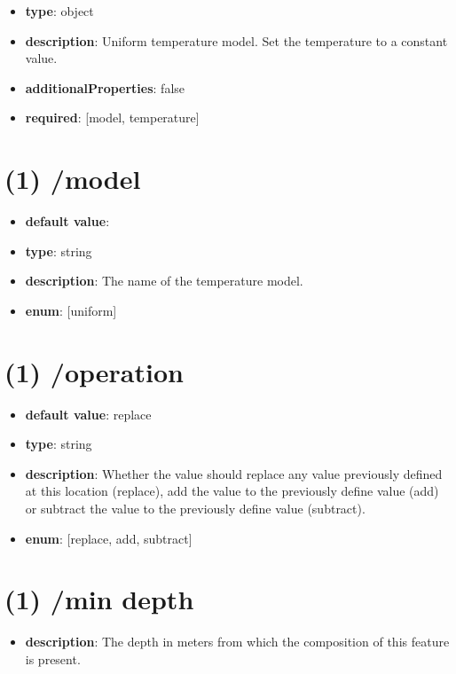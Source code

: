 \begin{itemize}[leftmargin=0em]\item {\bf type}: object
\item {\bf description}: Uniform temperature model. Set the temperature to a constant value.
\item {\bf additionalProperties}: false
\item {\bf required}: [model, temperature]\end{itemize}
\section{(1) /model}
\begin{itemize}[leftmargin=1em]\item {\bf default value}: 
\item {\bf type}: string
\item {\bf description}: The name of the temperature model.
\item {\bf enum}: [uniform]\end{itemize}\section{(1) /operation}
\begin{itemize}[leftmargin=1em]\item {\bf default value}: replace
\item {\bf type}: string
\item {\bf description}: Whether the value should replace any value previously defined at this location (replace), add the value to the previously define value (add) or subtract the value to the previously define value (subtract).
\item {\bf enum}: [replace, add, subtract]\end{itemize}\section{(1) /min depth}
\begin{itemize}[leftmargin=1em]\item {\bf description}: The depth in meters from which the composition of this feature is present.
\end{itemize}
